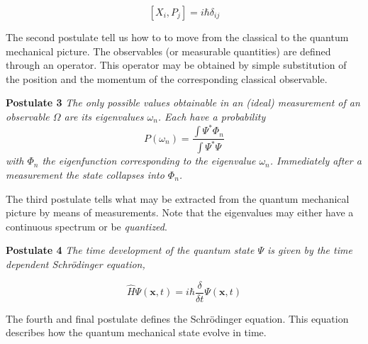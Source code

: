 \begin{equation*}
  \left[ X_i, P_j \right] = i \hbar \delta_{ij}
\end{equation*}

The second postulate tell us how to to move from the classical to the
quantum mechanical picture. The observables (or measurable quantities)
are defined through an operator. This operator may be obtained by
simple substitution of the position and the momentum of the
corresponding classical observable.
\newline


{\bf \large Postulate 3}
\emph{
The only possible values obtainable in an (ideal) measurement of an
observable $\Omega$ are its eigenvalues $\omega_n$. Each have a
probability
}
%
\begin{equation*}
  P(\omega_n) = \frac{\int \Psi^* \Phi_n }{\int \Psi^* \Psi }
\end{equation*}
%
\emph{
with $\Phi_n$ the eigenfunction corresponding to the eigenvalue
$\omega_n$. Immediately after a measurement the state collapses into
$\Phi_n$.
}
\newline

The third postulate tells what may be extracted from the quantum
mechanical picture by means of measurements. Note that the eigenvalues
may either have a continuous spectrum or be \emph{quantized}.
\newline



{\bf \large Postulate 4}
\emph{
The time development of the quantum state $\Psi$ is given by the time
dependent Schr\"odinger equation,
}

\begin{equation*}
  \hat{H} \Psi(\mathbf{x},t) = i\hbar \frac{\delta}{\delta
  t}\Psi(\mathbf{x},t) 
\end{equation*}

The fourth and final postulate defines the Schr\"odinger
equation. This equation describes how the quantum mechanical state
evolve in time.
\newline




